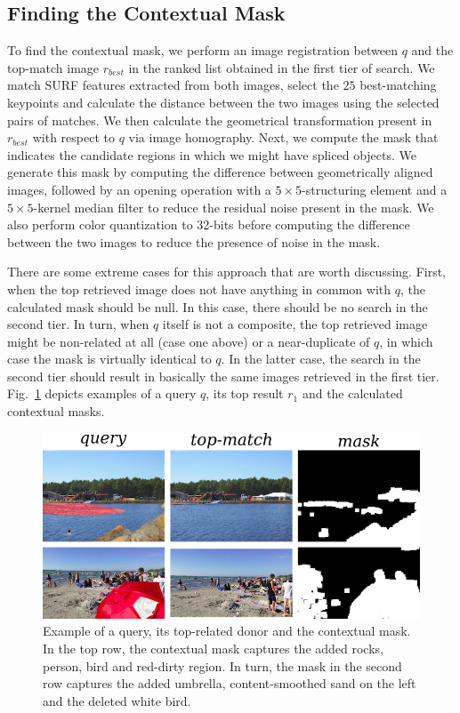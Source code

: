 \subsection{Finding the Contextual Mask}
To find the contextual mask, we perform an image registration between $q$ and the top-match image $r_{best}$ in the ranked list obtained in the first tier of search. We match SURF features extracted from both images, select the $25$ best-matching keypoints and calculate the distance between the two images using the selected pairs of matches. We then calculate the geometrical transformation present in $r_{best}$ with respect to $q$ via image homography. Next, we compute the mask that indicates the candidate regions in which we might have spliced objects. We generate this mask by computing the difference between geometrically aligned images, followed by an opening operation with a $5\times5$-structuring element and a $5\times5$-kernel median filter to reduce the residual noise present in the mask. We also perform color quantization to 32-bits before computing the difference between the two images to reduce the presence of noise in the mask. 

There are some extreme cases for this approach that are worth discussing. First, when the top retrieved image does not have anything in common with $q$, the calculated mask should be null. In this case, there should be no search in the second tier. In turn, when $q$ itself is not a composite, the top retrieved image might be non-related at all (case one above) or a near-duplicate of $q$, in which case the mask is virtually identical to $q$. In the latter case, the search in the second tier should result in basically the same images retrieved in the first tier. Fig.~\ref{fig:contextual:mask} depicts examples of a query $q$, its top result $r_1$ and the calculated contextual masks. 

\begin{figure}[t]
	\begin{center}
	\includegraphics[width=0.6\linewidth]{contextual-mask}
	\caption{Example of a query, its top-related donor and the contextual mask. In the top row, the contextual mask captures the added rocks, person, bird and red-dirty region. In turn, the mask in the second row captures the added umbrella, content-smoothed sand on the left and the deleted white bird. 
	\label{fig:contextual:mask}}
	\end{center}
\end{figure}
